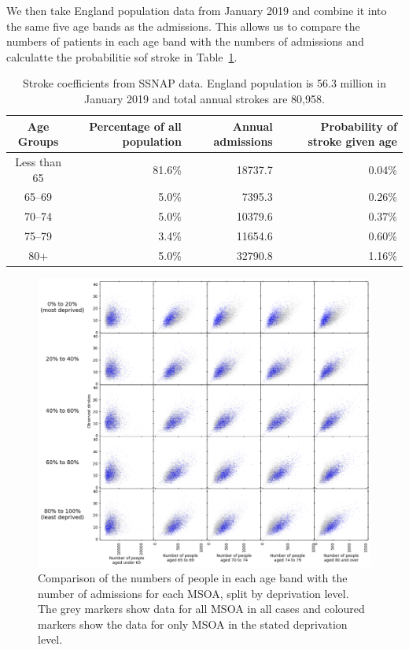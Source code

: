 \documentclass[12pt]{extarticle}
\begin{document}
We then take England population data from January 2019 and combine it into the same five age bands as the admissions.
This allows us to compare the numbers of patients in each age band with the numbers of admissions and calculatte the probabilitie sof stroke in Table~\ref{tab:ssnap_coeffs}.


\begin{table}
\centering
    \caption{Stroke coefficients from SSNAP data. England population is 56.3 million in January 2019 and total annual strokes are 80,958.}
    \begin{tabular}{crrr}
    Age Groups & Percentage of all population & Annual admissions & Probability of stroke given age \\
    \hline
    Less than 65 & 81.6\% & 18737.7 & 0.04\% \\
    65--69 & 5.0\% & 7395.3 & 0.26\% \\
    70--74 & 5.0\% & 10379.6 & 0.37\% \\
    75--79 & 3.4\% & 11654.6 & 0.60\% \\
    80+ & 5.0\% & 32790.8 & 1.16\% \\
    \end{tabular}
    \label{tab:ssnap_coeffs}
\end{table}

\begin{figure}
    \centering
    \includegraphics[width=1.0\linewidth]{images/scatter_age_admissions_by_imd.png}
    \caption{Comparison of the numbers of people in each age band with the number of admissions for each MSOA, split by deprivation level. The grey markers show data for all MSOA in all cases and coloured markers show the data for only MSOA in the stated deprivation level.}
    \label{fig:scatter_age_admissions_by_imd}
\end{figure}
\end{document}
